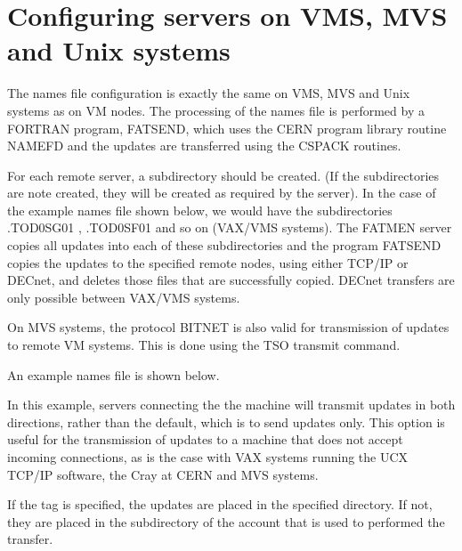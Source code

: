 \section{Configuring servers on VMS, MVS and Unix systems}
\par
The names file configuration is exactly the same on VMS, MVS and
Unix systems as on VM nodes. The processing of the names file
is performed by a FORTRAN program, FATSEND,  which uses the CERN program
library routine NAMEFD and the updates are transferred
using the CSPACK routines. 
\par
For each remote server, a subdirectory should be created.
(If the subdirectories are note created, they will be
created as required by the server).
In the case of the example names file shown below, we
would have the subdirectories \lsb .TOD0SG01 \rsb,
\lsb .TOD0SF01 \rsb and so on (VAX/VMS systems). 
The FATMEN server copies all updates into each of these
subdirectories and the program FATSEND copies the updates
to the specified remote nodes, using either TCP/IP or DECnet,
and deletes those files that are successfully copied.
DECnet transfers are only possible between VAX/VMS systems.
\par
On MVS systems, the protocol BITNET is also valid for transmission
of updates to remote VM systems. This is done using the TSO
transmit command.
\par
An example names file is shown below.

In this example, servers connecting the the machine 
will transmit updates in both directions, rather than the
default, which is to send updates only.
This option is useful for the transmission of updates
to a machine that does not accept incoming connections,
as is the case with VAX systems running the UCX TCP/IP software,
the Cray at CERN and MVS systems.

If the tag  is specified, the updates are placed in
the specified directory. If not, they are placed in the subdirectory
 of the account that is used to performed the transfer.

